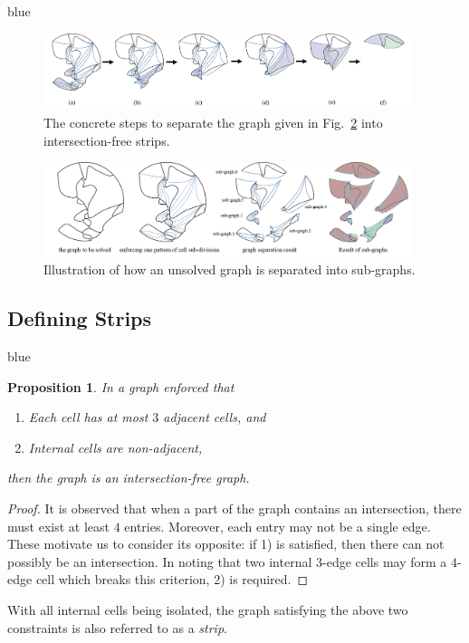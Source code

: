 \documentclass[journal]{IEEEtran}
\newtheorem{proposition}[theorem]{Proposition}
\begin{document}
\begin{color}{blue}
\begin{figure}[t]
\centering
\includegraphics[width=0.96\textwidth]{figures/steps_2}
\caption{The concrete steps to separate the graph given in Fig.~\ref{fig:complicated_graph} into intersection-free strips. }\label{fig:steps}
\end{figure}

\begin{figure}[t]
\centering
\includegraphics[width =0.96\textwidth]{figures/graph_separation_2}
\caption{Illustration of how an unsolved graph is separated into sub-graphs. }\label{fig:complicated_graph}
\end{figure}




\subsection{Defining Strips}
\begin{color}{blue}
\begin{proposition}
In a graph enforced that 
\begin{enumerate}
\item Each cell has at most $3$ adjacent cells, and
\item Internal cells are non-adjacent, 
\end{enumerate}
then the graph is an intersection-free graph. 
\end{proposition}
\begin{proof}
It is observed that when a part of the graph contains an intersection, there must exist at least $4$ entries. Moreover, each entry may not be a single edge.  
These motivate us to consider its opposite: if 1) is satisfied, then there can not possibly be an intersection. 
In noting that two internal $3$-edge cells may form a $4$-edge cell which breaks this criterion, 2) is required. 
\end{proof}
With all internal cells being isolated, the graph satisfying the above two constraints is also referred to as a \textit{strip}. 
\end{color}


\end{color}
\end{document}
